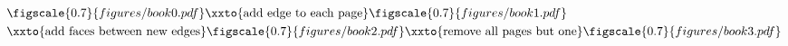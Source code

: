 \documentclass[border=3pt]{standalone}
\begin{document}
$\displaystyle
\begin{aligned}
&\figscale{0.7}{figures/book0.pdf}
		\xxto{\text{add edge to each page}}
		\figscale{0.7}{figures/book1.pdf}
		\\
		& \xxto{\text{add faces between new edges}}
		\figscale{0.7}{figures/book2.pdf}
		\xxto{\text{remove all pages but one}}  
		\figscale{0.7}{figures/book3.pdf}
\end{aligned}
$
\end{document}
